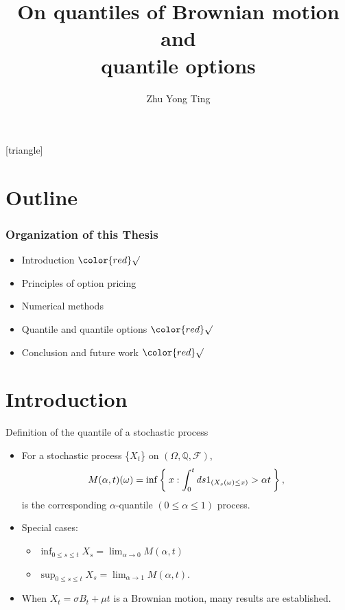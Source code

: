 \documentclass[cjk,10pt]{beamer}
\begin{document}
[triangle]

\title{On quantiles of Brownian motion and \\
quantile options}
\author{Zhu Yong Ting}
\date{} \frame{\titlepage}

\section{Outline}
\begin{frame}
\frametitle{Organization of this Thesis}

\begin{itemize}
\item Introduction  $\color{red}\surd$
\item Principles of option pricing 
\item Numerical methods
\item Quantile and quantile options $\color{red}\surd$
\item Conclusion and future work $\color{red}\surd$
\end{itemize}
\end{frame}

\section{Introduction} 
\begin{frame}{Definition of the quantile of a stochastic process}
\begin{itemize}
\item
For a stochastic process \{$X_t$\} on $(\Omega, \mathbb Q, \mathcal F)$, \\
\[
M(\alpha,t)(\omega) = \inf\Set{x:\int_0^t ds1_{(X_s (\omega)\leq x)} > \alpha t},
\]
is the corresponding $\alpha$-quantile $(0 \leq \alpha \leq 1)$ process.
\item
Special cases:
\begin{itemize}
\item $\displaystyle\inf_{0\leq s \leq t}  X_s = \lim_{\alpha\to 0}M(\alpha,t)$
\item $\displaystyle\sup_{0\leq s \leq t} X_s = \lim_{\alpha\to 1} M(\alpha, t)$.
\end{itemize}
\item When $X_t = \sigma B_t + \mu t$ is a Brownian motion, many results are established. 
\end{itemize}

\end{frame}
\end{document}
